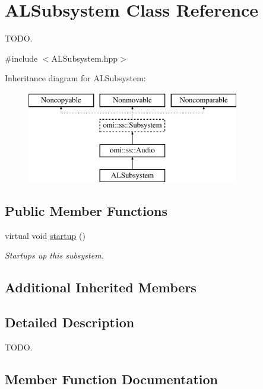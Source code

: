 \hypertarget{class_a_l_subsystem}{}\section{A\+L\+Subsystem Class Reference}
\label{class_a_l_subsystem}


T\+O\+DO.  




{\ttfamily \#include $<$A\+L\+Subsystem.\+hpp$>$}

Inheritance diagram for A\+L\+Subsystem\+:\begin{figure}[H]
\begin{center}
\leavevmode
\includegraphics[height=4.000000cm]{class_a_l_subsystem}
\end{center}
\end{figure}
\subsection*{Public Member Functions}
\begin{DoxyCompactItemize}
\item 
virtual void \hyperlink{class_a_l_subsystem_a46de88998ac77d7d64532471d30028b3}{startup} ()
\begin{DoxyCompactList}\small\item\em Startups up this subsystem. \end{DoxyCompactList}\end{DoxyCompactItemize}
\subsection*{Additional Inherited Members}


\subsection{Detailed Description}
T\+O\+DO. 

\subsection{Member Function Documentation}

